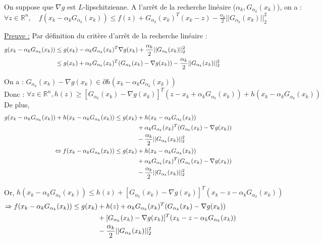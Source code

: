\documentclass[12pt,a4paper]{article}
\newcommand{\propriete}[2]{%
    \begin{tcolorbox}[colback=white,colframe=green!25!white,title=\textbf{Propriété #1}, coltitle=black]
        #2
    \end{tcolorbox}
}
\begin{document}
\propriete{}{
    On suppose que $\nabla g$ est $L$-lipschitzienne. A l'arrêt de la recherche linéaire ($\alpha_k, G_{\alpha_k}(x_k)$), on a :\\
    $\forall z \in \mathbb{R}^n, \quad f(x_k - \alpha_k G_{\alpha_k}(x_k)) \leq f(z) + G_{\alpha_k}(x_k)^T (x_k - z) - \frac{\alpha_k}{2} ||G_{\alpha_k}(x_k)||_2^2$
}

\noindent\underline{Preuve :}
Par définition du critère d'arrêt de la recherche linéaire :
\begin{align*}
    g(x_k - \alpha_k G_{\alpha_k}(x_k)) &\leq g(x_k) - \alpha_k G_{\alpha_k}(x_k)^T \nabla g(x_k) + \frac{\alpha_k}{2} ||G_{\alpha_k}(x_k)||_2^2 \hspace{14.5cm}\\
    &\leq g(x_k) + \alpha_k G_{\alpha_k}(x_k)^T (G_{\alpha_k}(x_k) - \nabla g(x_k)) - \frac{\alpha_k}{2} ||G_{\alpha_k}(x_k)||_2^2
\end{align*}

On a : $G_{\alpha_k}(x_k) - \nabla g(x_k) \in \partial h(x_k - \alpha_k G_{\alpha_k}(x_k))$\\
Donc : $\forall z \in \mathbb{R}^n, h(z) \geq [G_{\alpha_k}(x_k) - \nabla g(x_k)]^T (z - x_k + \alpha_k G_{\alpha_k}(x_k)) + h(x_k - \alpha_k G_{\alpha_k}(x_k))$\\

De plus,
\begin{align*}
    g(x_k - \alpha_k G_{\alpha_k}(x_k)) + h(x_k - \alpha_k G_{\alpha_k}(x_k)) \leq g(x_k) &+ h(x_k - \alpha_k G_{\alpha_k}(x_k))\\
    &+ \alpha_k G_{\alpha_k}(x_k)^T (G_{\alpha_k}(x_k) - \nabla g(x_k))\\
    &- \frac{\alpha_k}{2} ||G_{\alpha_k}(x_k)||_2^2 \hspace{14.5cm}\\
    \Leftrightarrow f(x_k - \alpha_k G_{\alpha_k}(x_k)) \leq g(x_k) &+ h(x_k - \alpha_k G_{\alpha_k}(x_k))\\
    &+ \alpha_k G_{\alpha_k}(x_k)^T (G_{\alpha_k}(x_k) - \nabla g(x_k))\\
    &- \frac{\alpha_k}{2} ||G_{\alpha_k}(x_k)||_2^2
\end{align*}

Or, $h(x_k - \alpha_k G_{\alpha_k}(x_k)) \leq h(z) + [G_{\alpha_k}(x_k) - \nabla g(x_k)]^T (x_k - z - \alpha_k G_{\alpha_k}(x_k))$\\
\begin{align*}
    \Rightarrow f(x_k - \alpha_k G_{\alpha_k}(x_k)) \leq g(x_k) &+ h(z) + \alpha_k G_{\alpha_k}(x_k)^T (G_{\alpha_k}(x_k) - \nabla g(x_k))\\
    &+ [G_{\alpha_k}(x_k) - \nabla g(x_k)]^T (x_k - z - \alpha_k G_{\alpha_k}(x_k))\\
    &- \frac{\alpha_k}{2} ||G_{\alpha_k}(x_k)||_2^2 \hspace{14.5cm}\\
\end{align*}
\end{document}
